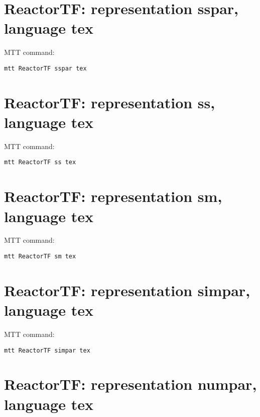 \section{\textbf{ReactorTF}: representation \textbf{sspar}, language \textbf{tex}}
\label{sec:ReactorTF_sspar.tex}


MTT command:
\begin{verbatim}
mtt ReactorTF sspar tex 
\end{verbatim}
  


\section{\textbf{ReactorTF}: representation \textbf{ss}, language \textbf{tex}}
\label{sec:ReactorTF_ss.tex}


MTT command:
\begin{verbatim}
mtt ReactorTF ss tex 
\end{verbatim}
  


\section{\textbf{ReactorTF}: representation \textbf{sm}, language \textbf{tex}}
\label{sec:ReactorTF_sm.tex}


MTT command:
\begin{verbatim}
mtt ReactorTF sm tex 
\end{verbatim}
  


\section{\textbf{ReactorTF}: representation \textbf{simpar}, language \textbf{tex}}
\label{sec:ReactorTF_simpar.tex}


MTT command:
\begin{verbatim}
mtt ReactorTF simpar tex 
\end{verbatim}
  


\section{\textbf{ReactorTF}: representation \textbf{numpar}, language \textbf{tex}}
\label{sec:ReactorTF_numpar.tex}


